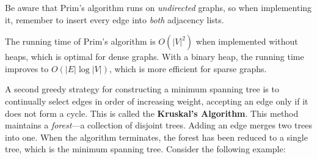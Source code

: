 Be aware that Prim's algorithm runs on \emph{undirected} graphs, so when implementing it, remember to insert every edge into \emph{both} adjacency lists.

The running time of Prim's algorithm is \(O(\vert V \vert^2)\) when implemented without heaps, which is optimal for dense graphs. With a binary heap, the running time improves to \(O(\vert E \vert \log \vert V \vert)\), which is more efficient for sparse graphs.

A second greedy strategy for constructing a minimum spanning tree is to continually select edges in order of increasing weight, accepting an edge only if it does not form a cycle. This is called the \textbf{Kruskal's Algorithm}. This method maintains a \textit{forest}—a collection of disjoint trees. Adding an edge merges two trees into one. When the algorithm terminates, the forest has been reduced to a single tree, which is the minimum spanning tree. Consider the following example: 

